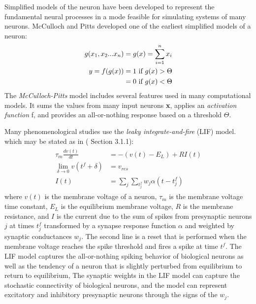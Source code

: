 Simplified models of the neuron have been developed to represent the fundamental neural processes in a mode feasible for simulating systems of many neurons.
McCulloch and Pitts\citep{McCulloch1943} developed one of the earliest simplified models of a neuron:
\begin{align}
  \begin{split}
    g(x_1,x_2...x_n) &= g(\boldmath{x})=\sum_{i=1}^n x_i \\
    y = f(g(x)) &= 1 \text{ if } g(x)>\Theta \\
		&= 0 \text{ if } g(x)<\Theta \\
  \end{split}
\end{align}
The \textit{McCulloch-Pitts} model includes several features used in many computational models.
It sums the values from many input neurons \textbf{x}, applies an \textit{activation function} f, and provides an all-or-nothing response based on a threshold $\Theta$.

Many phenomenological studies use the \textit{leaky integrate-and-fire} (LIF) model\citep{Abbott1999}. which may be stated as in (\citet{Trappenberg2010} Section 3.1.1):
\begin{align}\label{eq:lif}
  \begin{split}
    \tau_m \frac{dv(t)}{dt} &= -(v(t)-E_L) + RI(t) \\
    \displaystyle\lim_{\delta \rightarrow 0} v(t^f + \delta) &= v_{res}\\ 
    I(t) &= \sum_j \sum_{t^f_j}w_j\alpha(t-t^f_j)
  \end{split}
\end{align}
where $v(t)$ is the membrane voltage of a neuron, $\tau_m$ is the membrane voltage time constant, $E_L$ is the equilibrium membrane voltage, $R$ is the membrane resistance, and
$I$ is the current due to the sum of spikes from presynaptic neurons $j$ at times $t^f_j$ transformed by a synapse response function $\alpha$ and weighted by synaptic conductances $w_j$.
The second line is a reset that is performed when the membrane voltage reaches the spike threshold and fires a spike at time $t^f$.
The LIF model captures the all-or-nothing spiking behavior of biological neurons as well as the tendency of a neuron that is slightly perturbed from equilibrium to return to equilibrium,
The synaptic weights in the LIF model can capture the stochastic connectivity of biological neurons, and the model can represent excitatory and inhibitory presynaptic neurons through the signs of the $w_j$.

